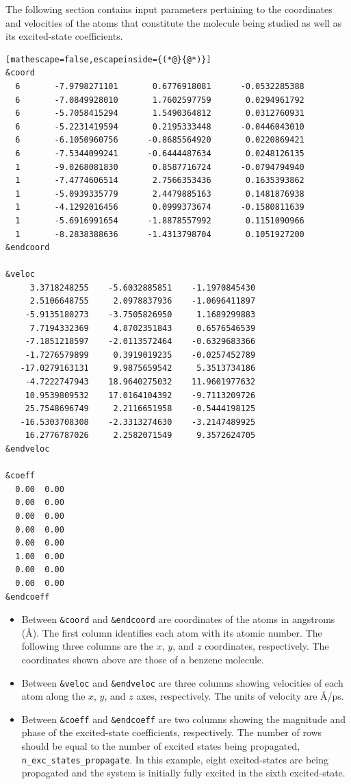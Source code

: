 \documentclass[letterpaper,12pt,titlepage]{article}
\begin{document}
\noindent The following section contains input parameters pertaining to the coordinates and velocities of the atoms that constitute the molecule being studied as well as its excited-state coefficients.
\begin{lstlisting}[mathescape=false,escapeinside={(*@}{@*)}]
&coord
  6       -7.9798271101       0.6776918081      -0.0532285388
  6       -7.0849928010       1.7602597759       0.0294961792
  6       -5.7058415294       1.5490364812       0.0312760931
  6       -5.2231419594       0.2195333448      -0.0446043010
  6       -6.1050960756      -0.8685564920       0.0220869421
  6       -7.5344099241      -0.6444487634       0.0248126135
  1       -9.0268081830       0.8587716724      -0.0794794940
  1       -7.4774606514       2.7566353436       0.1635393862
  1       -5.0939335779       2.4479885163       0.1481876938
  1       -4.1292016456       0.0999373674      -0.1580811639
  1       -5.6916991654      -1.8878557992       0.1151090966
  1       -8.2838388636      -1.4313798704       0.1051927200
&endcoord

&veloc
     3.3718248255    -5.6032885851    -1.1970845430
     2.5106648755     2.0978837936    -1.0696411897
    -5.9135180273    -3.7505826950     1.1689299883
     7.7194332369     4.8702351843     0.6576546539
    -7.1851218597    -2.0113572464    -0.6329683366
    -1.7276579899     0.3919019235    -0.0257452789
   -17.0279163131     9.9875659542     5.3513734186
    -4.7222747943    18.9640275032    11.9601977632
    10.9539809532    17.0164104392    -9.7113209726
    25.7548696749     2.2116651958    -0.5444198125
   -16.5303708308    -2.3313274630    -3.2147489925
    16.2776787026     2.2582071549     9.3572624705
&endveloc

&coeff
  0.00  0.00
  0.00  0.00
  0.00  0.00
  0.00  0.00
  0.00  0.00
  1.00  0.00
  0.00  0.00
  0.00  0.00
&endcoeff
\end{lstlisting}
\begin{itemize}
\item Between \verb+&coord+ and \verb+&endcoord+ are coordinates of the atoms in angstroms (\AA).  The first column identifies each atom with its atomic number.  The following three columns are the $x$, $y$, and $z$ coordinates, respectively.  The coordinates shown above are those of a benzene molecule.
\item Between \verb+&veloc+ and \verb+&endveloc+ are three columns showing velocities of each atom along the $x$, $y$, and $z$ axes, respectively.  The units of velocity are \AA/ps. 
\item Between \verb+&coeff+ and \verb+&endcoeff+ are two columns showing the magnitude and phase of the excited-state coefficients, respectively.  The number of rows should be equal to the number of excited states being propagated, \verb+n_exc_states_propagate+.  In this example, eight excited-states are being propagated and the system is initially fully excited in the sixth excited-state. 
\end{itemize}
\end{document}
